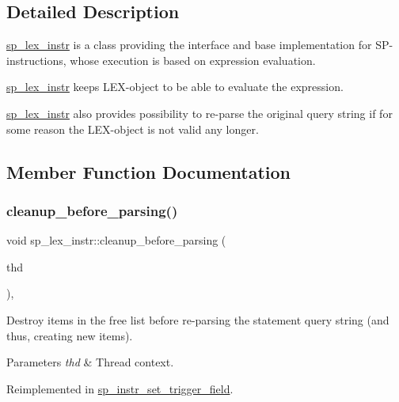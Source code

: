 \subsection{Detailed Description}
\mbox{\hyperlink{classsp__lex__instr}{sp\+\_\+lex\+\_\+instr}} is a class providing the interface and base implementation for SP-\/instructions, whose execution is based on expression evaluation.

\mbox{\hyperlink{classsp__lex__instr}{sp\+\_\+lex\+\_\+instr}} keeps L\+EX-\/object to be able to evaluate the expression.

\mbox{\hyperlink{classsp__lex__instr}{sp\+\_\+lex\+\_\+instr}} also provides possibility to re-\/parse the original query string if for some reason the L\+EX-\/object is not valid any longer. 

\subsection{Member Function Documentation}
\mbox{\label{classsp__lex__instr_aea0d857d412f89095bde90fa083e8c24}} 
\subsubsection{\texorpdfstring{cleanup\+\_\+before\+\_\+parsing()}{cleanup\_before\_parsing()}}
{\footnotesize\ttfamily void sp\+\_\+lex\+\_\+instr\+::cleanup\+\_\+before\+\_\+parsing (\begin{DoxyParamCaption}\item[{T\+HD $\ast$}]{thd }\end{DoxyParamCaption})\hspace{0.3cm}{\ttfamily [protected]}, {\ttfamily [virtual]}}

Destroy items in the free list before re-\/parsing the statement query string (and thus, creating new items).


\begin{DoxyParams}{Parameters}
{\em thd} & Thread context. \\
\hline
\end{DoxyParams}


Reimplemented in \mbox{\hyperlink{classsp__instr__set__trigger__field_a7dfa25f3120b0f312d0606c3ea9f8074}{sp\+\_\+instr\+\_\+set\+\_\+trigger\+\_\+field}}.

